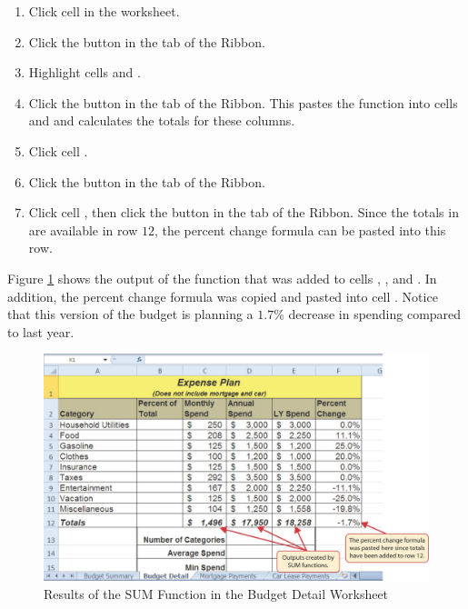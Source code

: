 \begin{enumerate}
	\item Click cell  in the  worksheet.
	\item Click the  button in the  tab of the Ribbon.
	\item Highlight cells  and .
	\item Click the  button in the  tab of the Ribbon. This pastes the  function into cells  and  and calculates the totals for these columns.
	\item Click cell .
	\item Click the  button in the  tab of the Ribbon.
	\item Click cell , then click the  button in the  tab of the Ribbon. Since the totals in are available in row $ 12 $, the percent change formula can be pasted into this row.
\end{enumerate}

Figure \ref{02:fig12} shows the output of the  function that was added to cells , , and . In addition, the percent change formula was copied and pasted into cell . Notice that this version of the budget is planning a $ 1.7 $\% decrease in spending compared to last year.

\begin{figure}[H]
	\centering
	\includegraphics[width=\maxwidth{.95\linewidth}]{gfx/ch02_fig12}
	\caption{Results of the SUM Function in the Budget Detail Worksheet}
	\label{02:fig12}
\end{figure}

